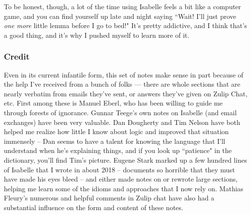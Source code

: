 To be honest, though, a lot of the time using Isabelle feels a bit like a computer game, and you can find yourself up late and night saying ``Wait! I'll just prove \textit{one more} little lemma before I go to bed!" It's pretty addictive, and I think that's a good thing, and it's why I pushed myself to learn more of it.  

\subsubsection{Credit}
Even in its current infantile form, this set of notes make sense in part because of the help I've received from a bunch of folks --- there are whole sections that are nearly verbatim from emails they've sent, or answers they've given on Zulip Chat, etc. First among these is Manuel Eberl, who has been willing to guide me through forests of ignorance. Gunnar Teege's own notes on Isabelle (and email exchanges) have been very valuable. Dan Dougherty and Tim Nelson have both helped me realize how little I know about logic and improved that situation immensely -- Dan seems to have a talent for knowing the language that I'll understand when he's explaining things, and if you look up ``patience" in the dictionary, you'll find Tim's picture. Eugene Stark marked up a few hundred lines of Isabelle that I wrote in about 2018 -- documents so horrible that they must have made his eyes bleed -- and either made notes on or rewrote large sections, helping me learn some of the idioms and approaches that I now rely on. Mathias Fleury's numerous and helpful comments in Zulip chat have also had a substantial influence on the form and content of these notes. 